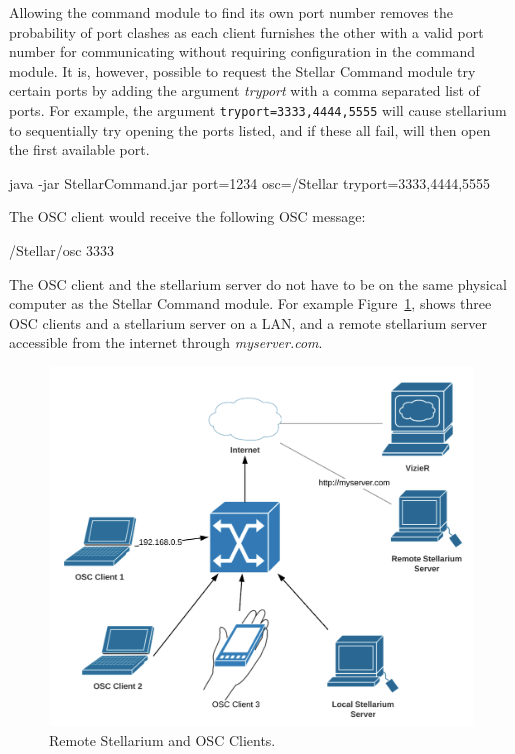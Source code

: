  
Allowing the command module to find its own port number removes the probability of port clashes as each client furnishes the other with a valid port number for communicating without requiring configuration in the command module. It is, however, possible to request the Stellar Command module try certain ports by adding the argument \textit{tryport} with a comma separated list of ports. For example, the argument \texttt{tryport=3333,4444,5555} will cause stellarium to sequentially try opening the ports listed, and if these all fail, will then open the first available port.\\
   
   \begin{syntax}
\medskip
   	java -jar StellarCommand.jar port=1234 osc=/Stellar  tryport=3333,4444,5555\\
\medskip
   \end{syntax}
   \bigskip
   
   The OSC client would receive the following OSC message:
   \begin{syntax}
   	/Stellar/osc 3333  \\
   \end{syntax}
   \bigskip
   
The OSC client and the stellarium server do not have to be on the same physical computer as the Stellar Command module. For example Figure~\ref{fig:RemoteStellarium}, shows three OSC clients and a stellarium server on a LAN, and a remote stellarium server accessible from the internet through \textit{myserver.com}.

\begin{figure}[htbp]
	\centering
	\includegraphics[width=1\columnwidth]{RemoteStellarium}
	\caption{Remote Stellarium and OSC Clients.}
	\label{fig:RemoteStellarium}
\end{figure}
\bigskip

